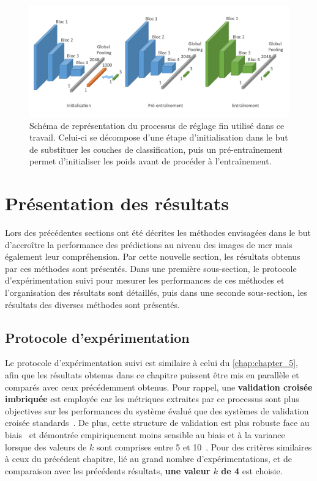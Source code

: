 \begin{figure}[H]
    \centering
    \includegraphics[width=\linewidth]{contents/chapter_6/resources/scheme_image_improvement_image_fine_tune.pdf}
    \caption{Schéma de représentation du processus de réglage fin utilisé dans ce travail. Celui-ci se décompose d'une étape d'initialisation dans le but de substituer les couches de classification, puis un pré-entraînement permet d'initialiser les poids avant de procéder à l'entraînement.}
    \label{fig:scheme_image_fine_tune}
\end{figure}\par
\clearpage

\section{Présentation des résultats}
Lors des précédentes sections ont été décrites les méthodes envisagées dans le but d'accroître la performance des prédictions au niveau des images de \gls{mcr} mais également leur compréhension. Par cette nouvelle section, les résultats obtenus par ces méthodes sont présentés. Dans une première sous-section, le protocole d'expérimentation suivi pour mesurer les performances de ces méthodes et l'organisation des résultats sont détaillés, puis dans une seconde sous-section, les résultats des diverses méthodes sont présentés.\par

\subsection{Protocole d'expérimentation}
Le protocole d'expérimentation suivi est similaire à celui du \cref{chap:chapter_5}, afin que les résultats obtenus dans ce chapitre puissent être mis en parallèle et comparés avec ceux précédemment obtenus. Pour rappel, une \textbf{validation croisée imbriquée} est employée car les métriques extraites par ce processus sont plus objectives sur les performances du système évalué que des systèmes de validation croisée standards~\cite{Cawley2010}. De plus, cette structure de validation est plus robuste face au biais~\cite{Cawley2010} et démontrée empiriquement moins sensible au biais et à la variance lorsque des valeurs de $k$ sont comprises entre 5 et 10~\cite{James2013}. Pour des critères similaires à ceux du précédent chapitre, lié au grand nombre d'expérimentations, et de comparaison avec les précédents résultats, \textbf{une valeur $k$ de 4} est choisie.\par

